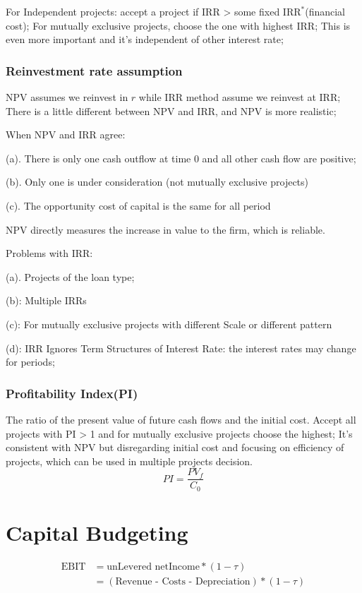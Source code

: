 \documentclass[10pt, a4paper]{article}
\begin{document}
                For Independent projects: accept a project if IRR > some fixed $\text{IRR}^*$(financial cost); For mutually exclusive projects, choose the one with highest IRR; This is even more important and it's independent of other interest rate; 
            \subsubsection{Reinvestment rate assumption}
                NPV assumes we reinvest in $r$  while IRR method assume we reinvest at IRR; There is a little different between NPV and IRR, and NPV is more realistic;

                When NPV and IRR agree: 
                
                \quad(a). There is only one cash outflow at time 0 and all other cash flow are positive; 

                \quad(b). Only one is under consideration (not mutually exclusive projects) 

                \quad(c). The opportunity cost of capital is the same for all period 

                NPV directly measures the increase in value to the firm, which is reliable. 

                Problems with IRR: 

                \quad(a). Projects of the loan type; 

                \quad(b): Multiple IRRs
                
                \quad(c):  For mutually exclusive projects with different Scale or different pattern

                \quad(d): IRR Ignores Term Structures of Interest Rate: the interest rates may change for periods;
            \subsubsection{Profitability Index(PI)}
                The ratio of the present value of future cash flows and the initial cost. Accept all projects with PI > 1 and for mutually exclusive projects choose the highest; It's consistent with NPV but disregarding initial cost and focusing on efficiency of projects, which can be used in multiple projects decision. 
                $$PI = \frac{PV_f}{C_0}$$
\newpage
    \section{Capital Budgeting}
    $$\begin{aligned}
        \text{EBIT} &= \text{unLevered netIncome} * (1 - \tau) \\
            &= (\text{Revenue - Costs - Depreciation}) * (1 - \tau)
    \end{aligned}$$
\end{document}
